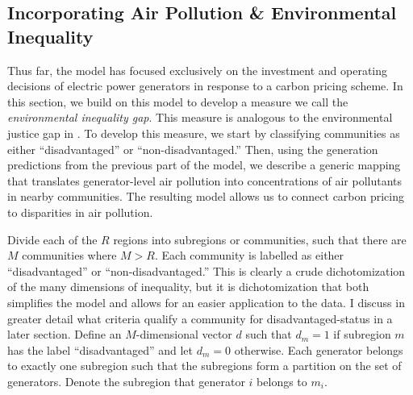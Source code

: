 



\subsection{Incorporating Air Pollution \& Environmental Inequality}

Thus far, the model has focused exclusively on the investment and operating decisions of electric power generators in response to a carbon pricing scheme. In this section, we build on this model to develop a measure we call the \emph{environmental inequality gap}. This measure is analogous to the environmental justice gap in \cite{hernandez2023environmental}. To develop this measure, we start by classifying communities as either ``disadvantaged'' or ``non-disadvantaged.'' Then, using the generation predictions from the previous part of the model, we describe a generic mapping that translates generator-level air pollution into concentrations of air pollutants in nearby communities. The resulting model allows us to connect carbon pricing to disparities in air pollution. 

Divide each of the $R$ regions into subregions or communities, such that there are $M$ communities where $M > R$. Each community is labelled as either ``disadvantaged'' or ``non-disadvantaged.'' This is clearly a crude dichotomization of the many dimensions of inequality, but it is dichotomization that both simplifies the model and allows for an easier application to the data. I discuss in greater detail what criteria qualify a community for disadvantaged-status in a later section. Define an $M$-dimensional vector $d$ such that $d_m = 1$ if subregion $m$ has the label ``disadvantaged'' and let $d_m = 0$ otherwise. Each generator belongs to exactly one subregion such that the subregions form a partition on the set of generators. Denote the subregion that generator $i$ belongs to $m_i$.

